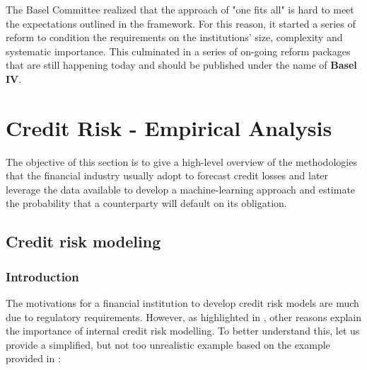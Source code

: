 \documentclass[a4paper,12pt]{article}
\begin{document}
    The Basel Committee realized that the approach of "one fits all" 
    is hard to meet the expectations outlined in the framework. 
    For this reason, it started a series of reform to condition the 
    requirements on the institutions' size, complexity and systematic importance. 
    This culminated in a series of on-going reform packages that are still happening 
    today and should be published under the name of \textbf{Basel IV}.
    \newline

    
    \pagebreak
    \section{Credit Risk - Empirical Analysis}

    The objective of this section is to give a high-level overview of the methodologies 
    that the financial industry usually adopt to forecast credit losses and later leverage 
    the data available to develop a machine-learning approach and estimate the probability 
    that a counterparty will default on its obligation.

    \subsection[]{Credit risk modeling}
    
        \subsubsection{Introduction}
        The motivations for a financial institution to develop credit risk models are much due to 
        regulatory requirements. However, as highlighted in \cite{bluhm2016introduction}, 
        other reasons explain the importance of internal credit risk modelling. 
        To better understand this, let us provide a simplified, but not too unrealistic 
        example based on the example provided in \cite{bluhm2016introduction}: 
   
\end{document}

